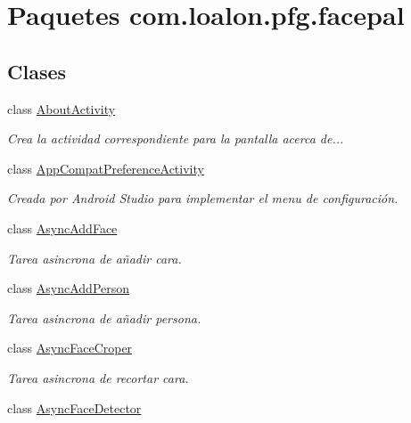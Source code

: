\hypertarget{namespacecom_1_1loalon_1_1pfg_1_1facepal}{}\section{Paquetes com.\+loalon.\+pfg.\+facepal}
\label{namespacecom_1_1loalon_1_1pfg_1_1facepal}
\subsection*{Clases}
\begin{DoxyCompactItemize}
\item 
class \mbox{\hyperlink{classcom_1_1loalon_1_1pfg_1_1facepal_1_1_about_activity}{About\+Activity}}
\begin{DoxyCompactList}\small\item\em Crea la actividad correspondiente para la pantalla acerca de... \end{DoxyCompactList}\item 
class \mbox{\hyperlink{classcom_1_1loalon_1_1pfg_1_1facepal_1_1_app_compat_preference_activity}{App\+Compat\+Preference\+Activity}}
\begin{DoxyCompactList}\small\item\em Creada por Android Studio para implementar el menu de configuración. \end{DoxyCompactList}\item 
class \mbox{\hyperlink{classcom_1_1loalon_1_1pfg_1_1facepal_1_1_async_add_face}{Async\+Add\+Face}}
\begin{DoxyCompactList}\small\item\em Tarea asincrona de añadir cara. \end{DoxyCompactList}\item 
class \mbox{\hyperlink{classcom_1_1loalon_1_1pfg_1_1facepal_1_1_async_add_person}{Async\+Add\+Person}}
\begin{DoxyCompactList}\small\item\em Tarea asincrona de añadir persona. \end{DoxyCompactList}\item 
class \mbox{\hyperlink{classcom_1_1loalon_1_1pfg_1_1facepal_1_1_async_face_croper}{Async\+Face\+Croper}}
\begin{DoxyCompactList}\small\item\em Tarea asincrona de recortar cara. \end{DoxyCompactList}\item 
class \mbox{\hyperlink{classcom_1_1loalon_1_1pfg_1_1facepal_1_1_async_face_detector}{Async\+Face\+Detector}}

\end{DoxyCompactItemize}
